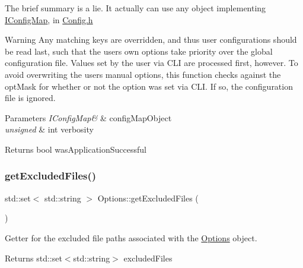 The brief summary is a lie. It actually can use any object implementing \mbox{\hyperlink{classIConfigMap}{I\+Config\+Map}}, in \mbox{\hyperlink{Config_8h}{Config.\+h}}

\begin{DoxyWarning}{Warning}
Any matching keys are overridden, and thus user configurations should be read last, such that the user\textquotesingle{}s own options take priority over the global configuration file. Values set by the user via C\+LI are processed first, however. To avoid overwriting the user\textquotesingle{}s manual options, this function checks against the opt\+Mask for whether or not the option was set via C\+LI. If so, the configuration file is ignored.
\end{DoxyWarning}

\begin{DoxyParams}{Parameters}
{\em I\+Config\+Map\&} & config\+Map\+Object \\
\hline
{\em unsigned} & int verbosity\\
\hline
\end{DoxyParams}
\begin{DoxyReturn}{Returns}
bool was\+Application\+Successful 
\end{DoxyReturn}
\mbox{\label{classOptions_ae5b813f7b6ea8d9e3315864957c77ae1}} 
\subsubsection{\texorpdfstring{getExcludedFiles()}{getExcludedFiles()}}
{\footnotesize\ttfamily std\+::set$<$ std\+::string $>$ Options\+::get\+Excluded\+Files (\begin{DoxyParamCaption}{ }\end{DoxyParamCaption})}



Getter for the excluded file paths associated with the \mbox{\hyperlink{classOptions}{Options}} object. 

\begin{DoxyReturn}{Returns}
std\+::set$<$std\+::string$>$ excluded\+Files 
\end{DoxyReturn}
\mbox{\label{classOptions_a728f8f4b4a04eaca1cfb8693288b7812}} 
